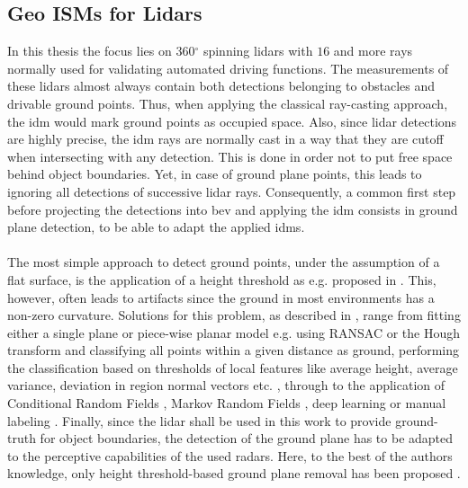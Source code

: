 \subsection{Geo ISMs for Lidars}
\label{subsec:geo_ism_lidar}
In this thesis the focus lies on 360$^\circ$ spinning lidars with $16$ and more rays normally used for validating automated driving functions. The measurements of these lidars almost always contain both detections belonging to obstacles and drivable ground points. Thus, when applying the classical ray-casting approach, the \gls{idm} would mark ground points as occupied space. Also, since lidar detections are highly precise, the \gls{idm} rays are normally cast in a way that they are cutoff when intersecting with any detection. This is done in order not to put free space behind object boundaries. Yet, in case of ground plane points, this leads to ignoring all detections of successive lidar rays. Consequently, a common first step before projecting the detections into \gls{bev} and applying the \gls{idm} consists in ground plane detection, to be able to adapt the applied \gls{idm}s. 
\\\\
The most simple approach to detect ground points, under the assumption of a flat surface, is the application of a height threshold as e.g. proposed in \cite{thrun2006stanley}. This, however, often leads to artifacts since the ground in most environments has a non-zero curvature. Solutions for this problem, as described in \cite{narksri2018slope}, range from fitting either a single plane or piece-wise planar model e.g. using RANSAC or the Hough transform \cite{fischler1981random,hough1962method,oliveira2016scene,tian2020fast} and classifying all points within a given distance as ground, performing the classification based on thresholds of local features like average height, average variance, deviation in region normal vectors etc. \cite{li2014motion,asvadi2015detection}, through to the application of Conditional Random Fields \cite{rummelhard2017ground}, Markov Random Fields \cite{guo2011graph}, deep learning \cite{zhang2014loam} or manual labeling \cite{velas2018cnn}. Finally, since the lidar shall be used in this work to provide ground-truth for object boundaries, the detection of the ground plane has to be adapted to the perceptive capabilities of the used radars. Here, to the best of the authors knowledge, only height threshold-based ground plane removal has been proposed \cite{weston2019probably,sless2019road}.
\\\\
